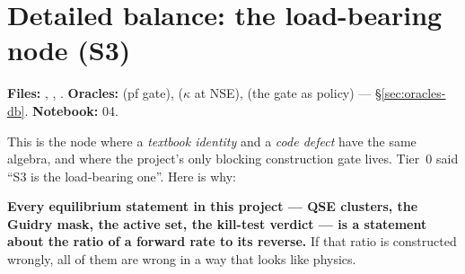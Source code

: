 %

\section{Detailed balance: the load-bearing node (S3)}
\label{part:db}

\begin{repopointer}
\textbf{Files:} , ,
. \quad
\textbf{Oracles:}  (pf gate),
 ($\kappa$ at NSE),
 (the gate as policy) ---
\S\ref{sec:oracles-db}. \quad
\textbf{Notebook:} 04.
\end{repopointer}

This is the node where a \emph{textbook identity} and a \emph{code defect} have
the same algebra, and where the project's only blocking construction gate lives.
Tier~0 said ``S3 is the load-bearing one''. Here is why:

\begin{invariant}
\textbf{Every equilibrium statement in this project --- QSE clusters, the Guidry
mask, the active set, the kill-test verdict --- is a statement about the ratio
of a forward rate to its reverse.} If that ratio is constructed wrongly, all of
them are wrong in a way that looks like physics.
\end{invariant}

